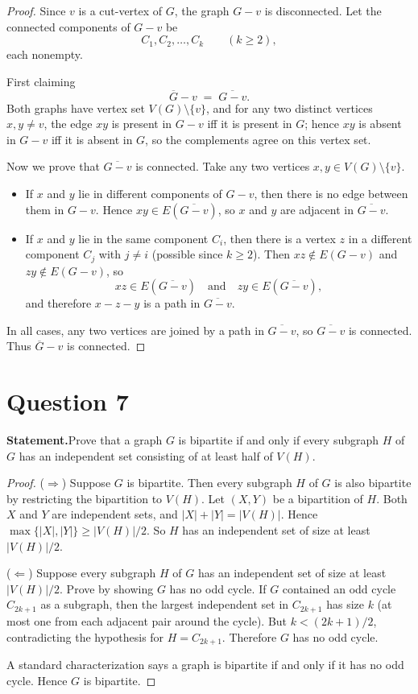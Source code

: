 \documentclass[11pt]{article}
\begin{document}
\begin{proof}
Since $v$ is a cut-vertex of $G$, the graph $G-v$ is disconnected. Let the connected components
of $G-v$ be
\[
C_1, C_2, \dots, C_k \qquad (k\ge 2),
\]
each nonempty.

First claiming
\[
\overline{G}-v \;=\; \overline{G-v}.
\]
Both graphs have vertex set $V(G)\setminus\{v\}$, and for any two distinct vertices
$x,y\neq v$, the edge $xy$ is present in $G-v$ iff it is present in $G$; hence $xy$ is absent in $G-v$
iff it is absent in $G$, so the complements agree on this vertex set.

Now we prove that $\overline{G-v}$ is connected. Take any two vertices $x,y\in V(G)\setminus\{v\}$.

\begin{itemize}
\item If $x$ and $y$ lie in different components of $G-v$, then there is no edge between them in $G-v$.
Hence $xy\in E(\overline{G-v})$, so $x$ and $y$ are adjacent in $\overline{G-v}$.

\item If $x$ and $y$ lie in the same component $C_i$, then there is a vertex $z$ in a different component $C_j$
with $j\neq i$ (possible since $k\ge 2$). Then $xz\notin E(G-v)$ and $zy\notin E(G-v)$, so
\[
xz\in E(\overline{G-v}) \quad\text{and}\quad zy\in E(\overline{G-v}),
\]
and therefore $x-z-y$ is a path in $\overline{G-v}$.
\end{itemize}

In all cases, any two vertices are joined by a path in $\overline{G-v}$, so $\overline{G-v}$ is connected.
Thus $\overline{G}-v$ is connected.
\end{proof}


\newpage

\section*{Question 7}
\textbf{Statement.}Prove that a graph $G$ is bipartite if and only if every subgraph $H$ of $G$ has an independent set consisting of at least half of $V(H)$.

\begin{proof}
($\Rightarrow$) Suppose $G$ is bipartite.
Then every subgraph $H$ of $G$ is also bipartite by restricting the bipartition to $V(H)$.
Let $(X,Y)$ be a bipartition of $H$.
Both $X$ and $Y$ are independent sets, and $|X|+|Y|=|V(H)|$.
Hence $\max\{|X|,|Y|\}\ge |V(H)|/2$.
So $H$ has an independent set of size at least $|V(H)|/2$.

($\Leftarrow$) Suppose every subgraph $H$ of $G$ has an independent set of size at least $|V(H)|/2$.
Prove by showing $G$ has no odd cycle.
If $G$ contained an odd cycle $C_{2k+1}$ as a subgraph, then the largest independent set in $C_{2k+1}$ has size $k$ (at most one from each adjacent pair around the cycle).
But $k < (2k+1)/2$, contradicting the hypothesis for $H=C_{2k+1}$.
Therefore $G$ has no odd cycle.

A standard characterization says a graph is bipartite if and only if it has no odd cycle.
Hence $G$ is bipartite.
\end{proof}
\end{document}
